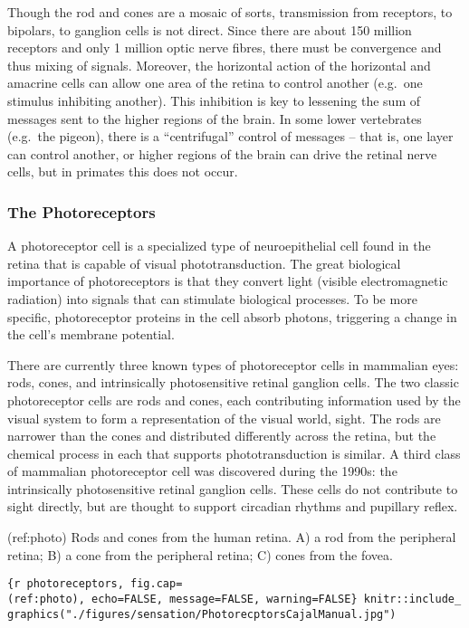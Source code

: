 Though the rod and cones are a mosaic of sorts, transmission from
receptors, to bipolars, to ganglion cells is not direct. Since there are
about 150 million receptors and only 1 million optic nerve fibres, there
must be convergence and thus mixing of signals. Moreover, the horizontal
action of the horizontal and amacrine cells can allow one area of the
retina to control another (e.g.~one stimulus inhibiting another). This
inhibition is key to lessening the sum of messages sent to the higher
regions of the brain. In some lower vertebrates (e.g.~the pigeon), there
is a ``centrifugal'' control of messages -- that is, one layer can
control another, or higher regions of the brain can drive the retinal
nerve cells, but in primates this does not occur.

\hypertarget{the-photoreceptors}{%
\subsubsection{The Photoreceptors}\label{the-photoreceptors}}

A photoreceptor cell is a specialized type of neuroepithelial cell found
in the retina that is capable of visual phototransduction. The great
biological importance of photoreceptors is that they convert light
(visible electromagnetic radiation) into signals that can stimulate
biological processes. To be more specific, photoreceptor proteins in the
cell absorb photons, triggering a change in the cell's membrane
potential.

There are currently three known types of photoreceptor cells in
mammalian eyes: rods, cones, and intrinsically photosensitive retinal
ganglion cells. The two classic photoreceptor cells are rods and cones,
each contributing information used by the visual system to form a
representation of the visual world, sight. The rods are narrower than
the cones and distributed differently across the retina, but the
chemical process in each that supports phototransduction is similar. A
third class of mammalian photoreceptor cell was discovered during the
1990s: the intrinsically photosensitive retinal ganglion cells. These
cells do not contribute to sight directly, but are thought to support
circadian rhythms and pupillary reflex.

(ref:photo) Rods and cones from the human retina. A) a rod from the
peripheral retina; B) a cone from the peripheral retina; C) cones from
the fovea.

\texttt{\{r\ photoreceptors,\ fig.cap=\textquotesingle{}(ref:photo)\textquotesingle{},\ echo=FALSE,\ message=FALSE,\ warning=FALSE\}\ knitr::include\_graphics("./figures/sensation/PhotorecptorsCajalManual.jpg")}

